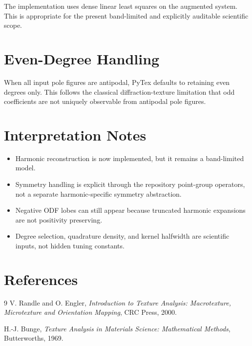 \documentclass[11pt]{article}
\begin{document}
The implementation uses dense linear least squares on the augmented system. This is
appropriate for the present band-limited and explicitly auditable scientific scope.

\section{Even-Degree Handling}

When all input pole figures are antipodal, PyTex defaults to retaining even degrees only.
This follows the classical diffraction-texture limitation that odd coefficients are not
uniquely observable from antipodal pole figures.

\section{Interpretation Notes}

\begin{itemize}
  \item Harmonic reconstruction is now implemented, but it remains a band-limited model.
  \item Symmetry handling is explicit through the repository point-group operators, not a
        separate harmonic-specific symmetry abstraction.
  \item Negative ODF lobes can still appear because truncated harmonic expansions are not
        positivity preserving.
  \item Degree selection, quadrature density, and kernel halfwidth are scientific inputs,
        not hidden tuning constants.
\end{itemize}

\section{References}

\begin{thebibliography}{9}
V. Randle and O. Engler,
\textit{Introduction to Texture Analysis: Macrotexture, Microtexture and Orientation Mapping},
CRC Press, 2000.

H.-J. Bunge,
\textit{Texture Analysis in Materials Science: Mathematical Methods},
Butterworths, 1969.

\end{thebibliography}
\end{document}
